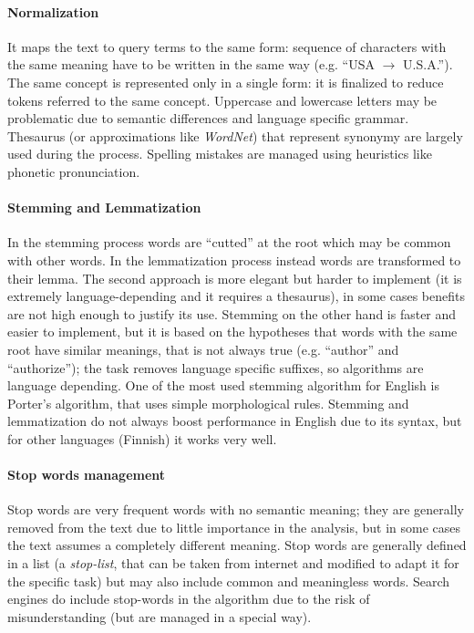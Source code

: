 \documentclass[11pt, a4page]{article}
\begin{document}
\paragraph{Normalization}
It maps the text to query terms to the same form: sequence of characters with the same meaning have to be written in the same way (e.g. ``USA $\rightarrow$ U.S.A.'').
The same concept is represented only in a single form: it is finalized to reduce tokens referred to the same concept.
Uppercase and lowercase letters may be problematic due to semantic differences and language specific grammar.
Thesaurus (or approximations like \textit{WordNet}) that represent synonymy are largely used during the process.
Spelling mistakes are managed using heuristics like phonetic pronunciation.

\paragraph{Stemming and Lemmatization}
In the stemming process words are ``cutted'' at the root which may be common with other words.
In the lemmatization process instead words are transformed to their lemma.
The second approach is more elegant but harder to implement (it is extremely language-depending and it requires a thesaurus), in some cases benefits are not high enough to justify its use.
Stemming on the other hand is faster and easier to implement, but it is based on the hypotheses that words with the same root have similar meanings, that is not always true (e.g. ``author'' and ``authorize''); the task removes language specific suffixes, so algorithms are language depending.
One of the most used stemming algorithm for English is Porter's algorithm, that uses simple morphological rules.
Stemming and lemmatization do not always boost performance in English due to its syntax, but for other languages (Finnish) it works very well.

\paragraph{Stop words management}
Stop words are very frequent words with no semantic meaning; they are generally removed from the text due to little importance in the analysis, but in some cases the text assumes a completely different meaning.
Stop words are generally defined in a list (a \textit{stop-list}, that can be taken from internet and modified to adapt it for the specific task) but may also include common and meaningless words.
Search engines do include stop-words in the algorithm due to the risk of misunderstanding (but are managed in a special way).
\newline
\end{document}
